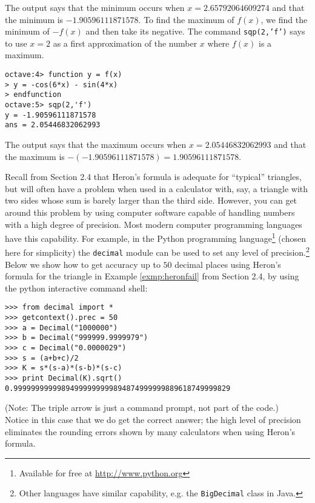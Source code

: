 The output says that the minimum occurs when $x=2.65792064609274$ and that the minimum is
$-1.90596111871578$. To find the maximum of $f(x)$, we find the minimum of $-f(x)$ and then take
its negative. The command \texttt{sqp(2,'f')} says to use $x=2$ as a first approximation
of the number $x$ where $f(x)$ is a maximum.

\begin{Verbatim}[frame=single,framesep=1mm]
octave:4> function y = f(x)
> y = -cos(6*x) - sin(4*x)
> endfunction
octave:5> sqp(2,'f')
y = -1.90596111871578
ans = 2.05446832062993
\end{Verbatim}

The output says that the maximum occurs when $x=2.05446832062993$
and that the maximum is $-(-1.90596111871578) = 1.90596111871578$.

Recall from Section 2.4 that Heron's formula is adequate for ``typical'' triangles, but will often
have a problem
when used in a calculator with, say, a triangle with two sides whose sum is barely larger than the
third side. However, you can get around this problem by using computer software capable of handling
numbers with a high degree of precision. Most modern computer programming languages have this
capability. For example, in the Python programming language\footnote{Available for free at
\url{http://www.python.org}} (chosen here for simplicity) the \texttt{decimal} module can be used
to set any level of precision.\footnote{Other languages have similar capability, e.g. the
\texttt{BigDecimal} class in Java.} Below we show how to get accuracy up to $50$ decimal places
using Heron's formula for the triangle in Example \ref{exmp:heronfail} from Section 2.4, by using
the python interactive command shell:

\begin{Verbatim}[frame=single,framesep=1mm]
>>> from decimal import *
>>> getcontext().prec = 50
>>> a = Decimal("1000000")
>>> b = Decimal("999999.9999979")
>>> c = Decimal("0.0000029")
>>> s = (a+b+c)/2
>>> K = s*(s-a)*(s-b)*(s-c)
>>> print Decimal(K).sqrt()
0.99999999999894999999999894874999999889618749999829
\end{Verbatim}

\noindent(Note: The triple arrow \texttt{} is
just a command prompt, not part of the code.)\\Notice in this case that we do
get the correct answer; the high level of precision eliminates the
rounding errors shown by many calculators when using Heron's formula.

